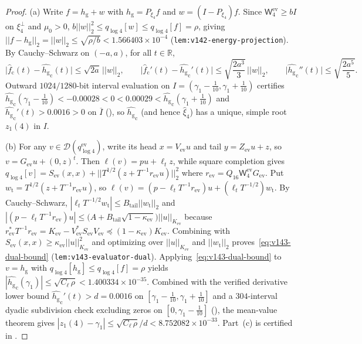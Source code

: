 \documentclass[11pt]{article}
\def\norm#1{||#1||}%
\theoremstyle{remark}
\newcommand{\norm}[1]{\left\lVert #1\right\rVert}
\begin{document}
\begin{proof}
(a) Write $f = h_{\mathrm{g}} + w$ with $h_{\mathrm{g}} = P_{\xi_4}f$ and $w = (I - P_{\xi_4})f$. Since $\mathsf{W}_4^{\mathrm{ev}} \ge bI$ on $\xi_4^\perp$ and $\mu_0 > 0$, $b\norm{w}_2^2 \le q_{\log 4}[w] \le q_{\log 4}[f] = \rho$, giving $\norm{f - h_{\mathrm{g}}}_2 = \norm{w}_2 \le \sqrt{\rho/b} < 1.566403 \times 10^{-4}$ (\texttt{lem:v142-energy-projection}). By Cauchy--Schwarz on $(-a,a)$, for all $t \in \mathbb{R}$,
\[
  \bigl|\widehat{f}_{\mathrm{c}}(t) - \widehat{h_{\mathrm{g}}}_{\mathrm{c}}(t)\bigr| \le \sqrt{2a}\,\norm{w}_2, \qquad
  \bigl|\widehat{f}_{\mathrm{c}}'(t) - \widehat{h_{\mathrm{g}}}_{\mathrm{c}}'(t)\bigr| \le \sqrt{\frac{2a^3}{3}}\,\norm{w}_2, \qquad
  \bigl|\widehat{h_{\mathrm{g}}}_{\mathrm{c}}''(t)\bigr| \le \sqrt{\frac{2a^5}{5}}.
\]
Outward $1024/1280$-bit interval evaluation on $I = (\gamma_1 - \tfrac{1}{10}, \gamma_1 + \tfrac{1}{10})$ certifies $\widehat{h_{\mathrm{g}}}_{\mathrm{c}}(\gamma_1 - \tfrac{1}{10}) < -0.00028 < 0 < 0.00029 < \widehat{h_{\mathrm{g}}}_{\mathrm{c}}(\gamma_1 + \tfrac{1}{10})$ and $\widehat{h_{\mathrm{g}}}_{\mathrm{c}}'(t) > 0.0016 > 0$ on $\overline{I}$ (), so $\widehat{h_{\mathrm{g}}}_{\mathrm{c}}$ (and hence $\widehat{\xi}_4$) has a unique, simple root $z_1(4)$ in $I$.

(b) For any $v \in \mathcal{D}(q_{\log 4}^{\mathrm{ev}})$, write its head $x = V_{\mathrm{ev}} u$ and tail $y = Z_{\mathrm{ev}} u + z$, so $v = G_{\mathrm{ev}} u + (0,z)^t$. Then $\ell(v) = pu + \ell_t z$, while square completion gives $q_{\log 4}[v] = S_{\mathrm{ev}}(x,x) + \norm{T^{1/2}(z + T^{-1}r_{\mathrm{ev}}u)}_2^2$ where $r_{\mathrm{ev}} = Q_{16}\mathsf{W}_4^{\mathrm{ev}}G_{\mathrm{ev}}$. Put $w_{\mathrm{t}} = T^{1/2}(z + T^{-1}r_{\mathrm{ev}}u)$, so $\ell(v) = (p - \ell_t T^{-1}r_{\mathrm{ev}})u + (\ell_t T^{-1/2})w_{\mathrm{t}}$. By Cauchy--Schwarz, $|\ell_t T^{-1/2}w_{\mathrm{t}}| \le B_{\mathrm{tail}}\norm{w_{\mathrm{t}}}_2$ and $|(p - \ell_t T^{-1}r_{\mathrm{ev}})u| \le \bigl(A + B_{\mathrm{tail}}\sqrt{1 - \kappa_{\mathrm{ev}}}\bigr)\norm{u}_{K_{\mathrm{ev}}}$ because $r_{\mathrm{ev}}^* T^{-1}r_{\mathrm{ev}} = K_{\mathrm{ev}} - V_{\mathrm{ev}}^* S_{\mathrm{ev}} V_{\mathrm{ev}} \preceq (1 - \kappa_{\mathrm{ev}})K_{\mathrm{ev}}$. Combining with $S_{\mathrm{ev}}(x,x) \ge \kappa_{\mathrm{ev}}\norm{u}_{K_{\mathrm{ev}}}^2$ and optimizing over $\norm{u}_{K_{\mathrm{ev}}}$ and $\norm{w_{\mathrm{t}}}_2$ proves~\eqref{eq:v143-dual-bound} (\texttt{lem:v143-evaluator-dual}). Applying~\eqref{eq:v143-dual-bound} to $v = h_{\mathrm{g}}$ with $q_{\log 4}[h_{\mathrm{g}}] \le q_{\log 4}[f] = \rho$ yields $|\widehat{h_{\mathrm{g}}}_{\mathrm{c}}(\gamma_1)| \le \sqrt{C_\ell\,\rho} < 1.400334 \times 10^{-35}$. Combined with the verified derivative lower bound $\widehat{h_{\mathrm{g}}}_{\mathrm{c}}'(t) > d = 0.0016$ on $[\gamma_1 - \tfrac{1}{10}, \gamma_1 + \tfrac{1}{10}]$ and a $304$-interval dyadic subdivision check excluding zeros on $[0, \gamma_1 - \tfrac{1}{10}]$ (), the mean-value theorem gives $|z_1(4) - \gamma_1| \le \sqrt{C_\ell\,\rho}/d < 8.752082 \times 10^{-33}$. Part~(c) is certified in .
\end{proof}
\end{document}

